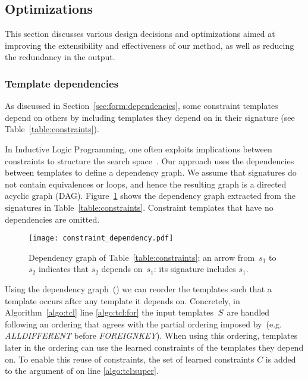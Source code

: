 \subsection{Optimizations} \label{sec:opts}
This section discusses various design decisions and optimizations aimed at improving the extensibility and effectiveness of our method, as well as reducing the redundancy in the output.

\subsubsection{Template dependencies}
As discussed in Section~\ref{sec:form:dependencies}, some constraint templates depend on others by including templates they depend on in their signature (see Table~\ref{table:constraints}).

In Inductive Logic Programming, one often exploits implications between constraints to structure the search space~\cite{luc_book}.
Our approach uses the dependencies between templates to define a dependency graph.
We assume that signatures do not contain equivalences or loops, and hence the resulting graph is a directed acyclic graph (DAG).
Figure~\ref{fig:learning_order} shows the dependency graph extracted from the signatures in Table~\ref{table:constraints}. 
Constraint templates that have no dependencies are omitted.

\begin{figure}[t]
  \centering
  \texttt{[image: constraint\_dependency.pdf]}
  \caption{Dependency graph of Table~\ref{table:constraints}; an arrow from~$s_1$ to~$s_2$ indicates that $s_2$ depends on~$s_1$: its signature includes $s_1$.
  }
  \label{fig:learning_order}
\end{figure}

Using the dependency graph~(\dependencies) we can reorder the templates such that a template occurs after any template it depends on.
Concretely, in Algorithm~\ref{algo:tcl} line \ref{algo:tcl:for} the input templates~$S$ are handled following an ordering that agrees with the partial ordering imposed by~\dependencies (e.g. \textit{ALLDIFFERENT} before \textit{FOREIGNKEY}).
When using this ordering, templates later in the ordering can use the learned constraints of the templates they depend on.
To enable this reuse of constraints, the set of learned constraints $C$ is added to the argument of \generategroups on line \ref{algo:tcl:super}.

